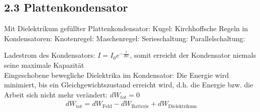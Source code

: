 \subsection*{2.3 Plattenkondensator}
    Mit Dielektrikum gefüllter Plattenkondensator:
    Kugel:
    Kirchhoffsche Regeln in Kondensatoren:
    Knotenregel:
    Maschenregel:
    Serieschaltung:
    Parallelschaltung:

    Ladestrom des Kondensators: $I = I_0 e^{-\frac{t}{RC}}$, somit erreicht der Kondensator niemals seine maximale Kapazität\\

    Eingeschobene bewegliche Dielektrika im Kondensator: Die Energie wird minimiert, bis ein Gleichgewichtszustand erreicht wird, d.h. die Energie bzw. die Arbeit sich nicht mehr verändert: $dW_{tot} = 0$
    \begin{align*}
        d W_{\text{tot}} = d W_{\text{Feld}} - d W_{\text{Batterie}} + d W_{\text{Dielektrikum}}
    \end{align*}